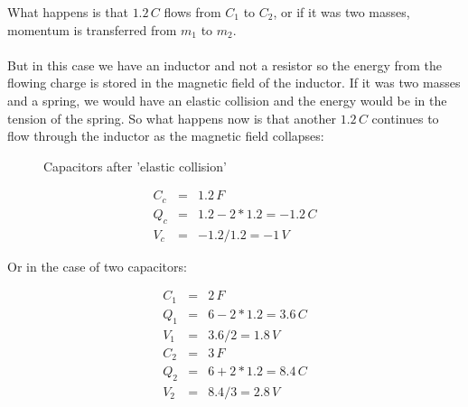 What happens is that $1.2 \, C$ flows from $C_1$ to $C_2$, or if it was two masses, momentum is transferred from $m_1$ to $m_2$.\\
\\
But in this case we have an inductor and not a resistor so the energy from the flowing charge is stored in the magnetic field of the inductor.
If it was two masses and a spring, we would have an elastic collision and the energy would be in the tension of the spring.
So what happens now is that another $1.2 \, C$ continues to flow through the inductor as the magnetic field collapses:

\begin{figure}[ht] \centering
	\qquad
	\caption{Capacitors after 'elastic collision'}
\end{figure}

\begin{eqnarray}
C_c &=& 1.2 \, F \\
Q_c &=& 1.2 - 2*1.2 = -1.2 \, C \\
V_c &=& -1.2 / 1.2 = -1 \, V
\end{eqnarray}

Or in the case of two capacitors:

\begin{eqnarray}
C_1 &=& 2 \, F \\
Q_1 &=& 6 - 2*1.2 = 3.6 \, C \\
V_1 &=& 3.6 / 2 = 1.8 \, V \\
C_2 &=& 3 \, F \\
Q_2 &=& 6 + 2*1.2 = 8.4 \, C \\
V_2 &=& 8.4 / 3 = 2.8 \, V 
\end{eqnarray}

